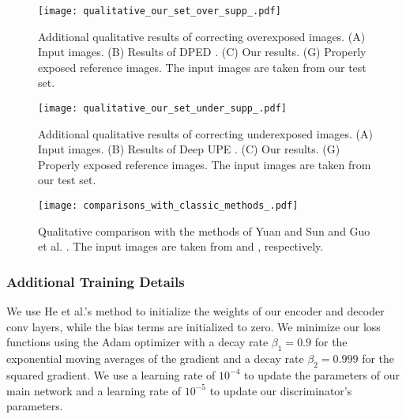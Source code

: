 \documentclass[final]{cvpr}
\begin{document}
  
 \begin{figure*}[t]
 \centering
 \texttt{[image: qualitative\_our\_set\_over\_supp\_.pdf]}
 \vspace{-2mm}
 \caption{Additional qualitative results of correcting overexposed images. (A) Input images. (B) Results of DPED \cite{DPED}. (C) Our results. (G) Properly exposed reference images. The input images are taken from our test set.\vspace{-2mm}}
 \label{fig:qualitative_our_set_over_supp}
 \end{figure*}
 
 \begin{figure*}[t]
 \centering
 \texttt{[image: qualitative\_our\_set\_under\_supp\_.pdf]}
 \vspace{-2mm}
 \caption{Additional qualitative results of correcting underexposed images. (A) Input images. (B) Results of Deep UPE \cite{DeepUPE}. (C) Our results. (G) Properly exposed reference images. The input images are taken from our test set.\vspace{-2mm}}
 \label{fig:qualitative_our_set_under_supp}
 \end{figure*}
 

 

 
 
 


 \begin{figure*}[t]
 \centering
 \texttt{[image: comparisons\_with\_classic\_methods\_.pdf]}
 \vspace{-2mm}
 \caption{Qualitative comparison with the methods of Yuan and Sun \cite{yuan2012automatic} and Guo et al. \cite{guo2010correcting}. The input images are taken from  \cite{yuan2012automatic} and \cite{guo2010correcting}, respectively.}
 \label{fig:comparisons_old_methods}
 \end{figure*}
 
 
 
 

 

 


\subsubsection{Additional Training Details}\label{subsec:training_details_supp} 
We use He et al.'s method \cite{he2015delving} to initialize the weights of our encoder and decoder conv layers, while the bias terms are initialized to zero. We minimize our loss functions using the Adam optimizer \cite{kingma2014adam} with a decay rate $\beta_1 = 0.9$ for the exponential moving averages of the gradient and a decay rate $\beta_2 = 0.999$ for the squared gradient. We use a learning rate of $10^{-4}$ to update the parameters of our main network and a learning rate of $10^{-5}$ to update our discriminator's parameters.
\end{document}
